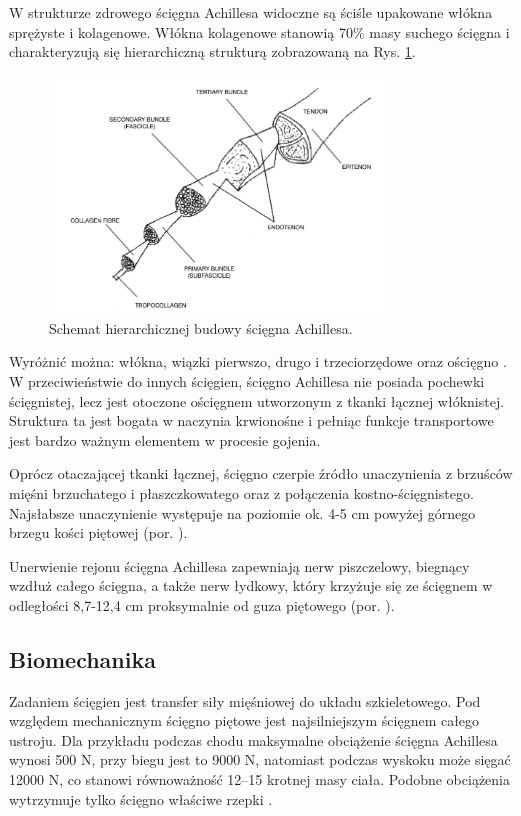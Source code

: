 W strukturze zdrowego ścięgna Achillesa widoczne są ściśle upakowane włókna sprężyste i kolagenowe. Włókna kolagenowe stanowią 70\% masy suchego ścięgna i charakteryzują się hierarchiczną strukturą zobrazowaną na Rys. \ref{Achilles-histology}.  
\begin{figure}[h!]
	\centering
	\includegraphics[width=0.8\textwidth]{figures/Achilles_hist.png}
	\caption{Schemat hierarchicznej budowy ścięgna Achillesa.}
	\label{Achilles-histology}
\end{figure}

Wyróżnić można: włókna, wiązki pierwszo, drugo i trzeciorzędowe oraz ościęgno \cite{Sharma2006}. W przeciwieństwie do innych ścięgien, ścięgno Achillesa nie posiada pochewki ścięgnistej, lecz jest otoczone ościęgnem utworzonym z tkanki łącznej włóknistej. Struktura ta jest bogata w naczynia krwionośne i pełniąc funkcje transportowe jest bardzo ważnym elementem w procesie gojenia. 

Oprócz otaczającej tkanki łącznej, ścięgno czerpie źródło unaczynienia z brzuśców mięśni brzuchatego i płaszczkowatego oraz z połączenia kostno-ścięgnistego. Najsłabsze unaczynienie występuje na poziomie ok. 4-5 cm powyżej górnego brzegu kości piętowej (por. \cite{bochenek2016anatomia}).

Unerwienie rejonu ścięgna Achillesa zapewniają nerw piszczelowy, biegnący wzdłuż całego ścięgna, a także nerw łydkowy, który krzyżuje się ze ścięgnem w odległości 8,7-12,4 cm proksymalnie od guza piętowego (por. \cite{bochenek2016anatomia}). 

\subsection{Biomechanika}
\label{Biomechanika}
Zadaniem ścięgien jest transfer siły mięśniowej do układu szkieletowego. Pod względem mechanicznym ścięgno piętowe jest najsilniejszym ścięgnem całego ustroju. Dla przykładu podczas chodu maksymalne obciążenie ścięgna Achillesa wynosi 500 N, przy biegu jest to 9000 N, natomiast podczas wyskoku może sięgać 12000 N, co stanowi równoważność 12--15 krotnej masy ciała. Podobne obciążenia wytrzymuje tylko ścięgno właściwe rzepki \cite{Etiologia}.

